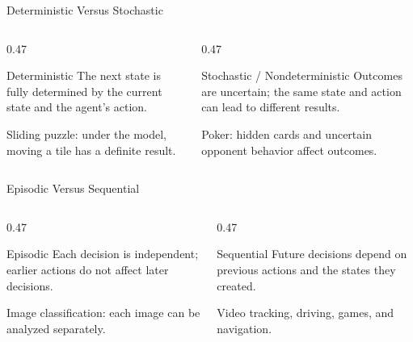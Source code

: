 \documentclass[aspectratio=169,10pt]{beamer}
\begin{document}
\begin{frame}{Deterministic Versus Stochastic}
  \begin{columns}[T,onlytextwidth]
    \begin{column}{0.47\textwidth}
      \begin{block}{Deterministic}
        The next state is fully determined by the current state and the agent's action.
      \end{block}
      \begin{exampleblockcp}
        Sliding puzzle: under the model, moving a tile has a definite result.
      \end{exampleblockcp}
    \end{column}
    \begin{column}{0.47\textwidth}
      \begin{block}{Stochastic / Nondeterministic}
        Outcomes are uncertain; the same state and action can lead to different results.
      \end{block}
      \begin{exampleblockcp}
        Poker: hidden cards and uncertain opponent behavior affect outcomes.
      \end{exampleblockcp}
    \end{column}
  \end{columns}
\end{frame}

\begin{frame}{Episodic Versus Sequential}
  \begin{columns}[T,onlytextwidth]
    \begin{column}{0.47\textwidth}
      \begin{block}{Episodic}
        Each decision is independent; earlier actions do not affect later decisions.
      \end{block}
      \begin{exampleblockcp}
        Image classification: each image can be analyzed separately.
      \end{exampleblockcp}
    \end{column}
    \begin{column}{0.47\textwidth}
      \begin{block}{Sequential}
        Future decisions depend on previous actions and the states they created.
      \end{block}
      \begin{exampleblockcp}
        Video tracking, driving, games, and navigation.
      \end{exampleblockcp}
    \end{column}
  \end{columns}
\end{frame}
\end{document}
